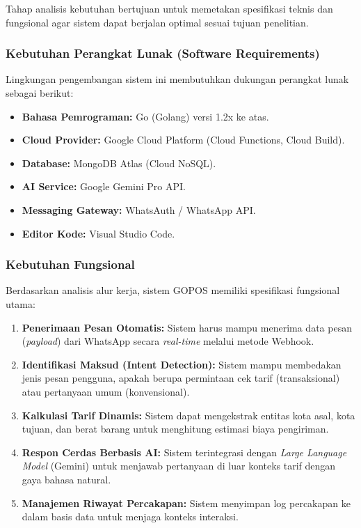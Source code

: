 Tahap analisis kebutuhan bertujuan untuk memetakan spesifikasi teknis dan fungsional agar sistem dapat berjalan optimal sesuai tujuan penelitian.

\subsubsection{Kebutuhan Perangkat Lunak (Software Requirements)}

Lingkungan pengembangan sistem ini membutuhkan dukungan perangkat lunak sebagai berikut:

\begin{itemize}[leftmargin=*]
    \item \textbf{Bahasa Pemrograman:} Go (Golang) versi 1.2x ke atas.
    \item \textbf{Cloud Provider:} Google Cloud Platform (Cloud Functions, Cloud Build).
    \item \textbf{Database:} MongoDB Atlas (Cloud NoSQL).
    \item \textbf{AI Service:} Google Gemini Pro API.
    \item \textbf{Messaging Gateway:} WhatsAuth / WhatsApp API.
    \item \textbf{Editor Kode:} Visual Studio Code.
\end{itemize}

\subsubsection{Kebutuhan Fungsional}

Berdasarkan analisis alur kerja, sistem GOPOS memiliki spesifikasi fungsional utama:

\begin{enumerate}[leftmargin=*]
    \item \textbf{Penerimaan Pesan Otomatis:} Sistem harus mampu menerima data pesan (\textit{payload}) dari WhatsApp secara \textit{real-time} melalui metode Webhook.
    \item \textbf{Identifikasi Maksud (Intent Detection):} Sistem mampu membedakan jenis pesan pengguna, apakah berupa permintaan cek tarif (transaksional) atau pertanyaan umum (konvensional).
    \item \textbf{Kalkulasi Tarif Dinamis:} Sistem dapat mengekstrak entitas kota asal, kota tujuan, dan berat barang untuk menghitung estimasi biaya pengiriman.
    \item \textbf{Respon Cerdas Berbasis AI:} Sistem terintegrasi dengan \textit{Large Language Model} (Gemini) untuk menjawab pertanyaan di luar konteks tarif dengan gaya bahasa natural.
    \item \textbf{Manajemen Riwayat Percakapan:} Sistem menyimpan log percakapan ke dalam basis data untuk menjaga konteks interaksi.
\end{enumerate}

